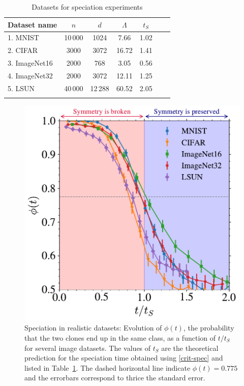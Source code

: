 \documentclass[10pt,twocolumn]{article}
\begin{document}
\begin{table}[!t]%
\centering
\caption{Datasets for speciation experiments}
\begin{tabular}{lcccccc}
Dataset name & $n$ & $d$ & $\Lambda$ & $t_S$ \\
\midrule
1. MNIST & 10\,000 & 1024 & 7.66 & 1.02 \\
2. CIFAR & 3000 & 3072 & 16.72 & 1.41 \\
3. ImageNet16 & 2000 & 768 & 3.05 & 0.56 \\
4. ImageNet32 & 2000 & 3072 & 12.11 & 1.25 \\
5. LSUN & 40\,000 & 12\,288 & 60.52 & 2.05 \\
\bottomrule
\label{tab:datasets}
\end{tabular}
\end{table}


\begin{figure}%
\centering
\includegraphics[width=1\linewidth]{Figures/Symmetry_breaking_all_3std.pdf}
\caption{Speciation in realistic datasets: Evolution of $\phi(t)$, the probability that the two clones end up in the same class, as a function of $t/t_S$ for several image datasets. The values of $t_S$ are the theoretical prediction for the speciation time obtained using \eqref{crit-spec} and listed in Table~\ref{tab:datasets}. The dashed horizontal line indicate $\phi(t) = 0.775$ and the errorbars correspond to thrice the standard error.
}
\label{fig:speciation}
\end{figure}
\end{document}
